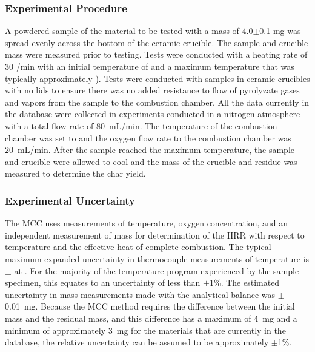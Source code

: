 \documentclass[12pt,oneside]{book}
\begin{document}
\subsubsection{Experimental Procedure}

A powdered sample of the material to be tested with a mass of 4.0$\pm$0.1 mg was spread evenly across the bottom of the ceramic crucible. The sample and crucible mass were measured prior to testing. Tests were conducted with a heating rate of 30 \degC{}/min with an initial temperature of  and a maximum temperature that was typically approximately ). Tests were conducted with samples in ceramic crucibles with no lids to ensure there was no added resistance to flow of pyrolyzate gases and vapors from the sample to the combustion chamber. All the data currently in the database were collected in experiments conducted in a nitrogen atmosphere with a total flow rate of 80~mL/min. The temperature of the combustion chamber was set to  and the oxygen flow rate to the combustion chamber was 20~mL/min. After the sample reached the maximum temperature, the sample and crucible were allowed to cool and the mass of the crucible and residue was measured to determine the char yield. 

\subsubsection{Experimental Uncertainty}

The MCC uses measurements of temperature, oxygen concentration, and an independent measurement of mass for determination of the HRR with respect to temperature and the effective heat of complete combustion. The typical maximum expanded uncertainty in thermocouple measurements of temperature is $\pm$ at . For the majority of the temperature program experienced by the sample specimen, this equates to an uncertainty of less than $\pm$1\%. The estimated uncertainty in mass measurements made with the analytical balance was $\pm$0.01~mg. Because the MCC method requires the difference between the initial mass and the residual mass, and this difference has a maximum of 4~mg and a minimum of approximately 3~mg for the materials that are currently in the database, the relative uncertainty can be assumed to be approximately $\pm$1\%.
\end{document}
